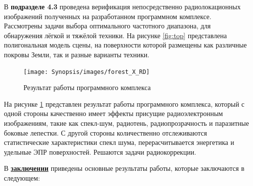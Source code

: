 В \textbf{подразделе 4.3} проведена верификация непосредственно радиолокационных изображений полученных на разработанном программном комплексе. Рассмотрены задачи выбора оптимального частотного диапазона, для обнаружения лёгкой и тяжёлой техники.
На рисунке \ref{fig:top} представлена полигональная модель сцены, на поверхности которой размещены как различные покровы Земли, так и разные варианты техники.


\begin{figure}
    \centering
    \texttt{[image: Synopsis/images/forest\_X\_RD]}
    \caption{Результат работы программного комплекса}
    \label{fig:forestxrd}
\end{figure}

На рисунке \ref{fig:forestxrd} представлен результат работы программного комплекса, который с одной стороны качественно имеет эффекты присущие радиоэлектронным изображениям, такие как спекл-шум, радиотень, радиопрозрачность и паразитные боковые лепестки. С другой стороны количественно отслеживаются статистические характеристики спекл шума, перерасчитывается энергетика и удельные ЭПР поверхностей. Решаются задачи радиокоррекции.

\FloatBarrier
{}                                  %
В \underline{\textbf{заключении}} приведены основные результаты работы, которые заключаются в следующем:



